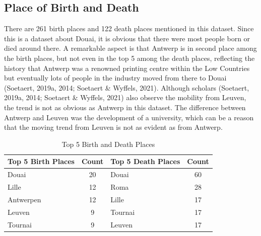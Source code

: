 \documentclass[12pt,a4paper,oneside]{book}
\begin{document}
\begin{sloppypar}
\subsection*{Place of Birth and Death}
There are 261 birth places and 122 death places mentioned in this dataset. Since this is a dataset about Douai, it is obvious that there were most people born or died around there. A remarkable aspect is that Antwerp is in second place among the birth places, but not even in the top 5 among the death places, reflecting the history that Antwerp was a renowned printing centre within the Low Countries but eventually lots of people in the industry moved from there to Douai (Soetaert, 2019a, 2014; Soetaert \& Wyffels, 2021). Although scholars (Soetaert, 2019a, 2014; Soetaert \& Wyffels, 2021) also observe the mobility from Leuven, the trend is not as obvious as Antwerp in this dataset. The difference between Antwerp and Leuven was the development of a university, which can be a reason that the moving trend from Leuven is not as evident as from Antwerp.

\begin{table}[H]
\centering
\caption{Top 5 Birth and Death Places}
\label{tab:top5BD}
\begin{tabular}{l|c|l|c}
\multicolumn{1}{c|}{\textbf{Top 5 Birth Places}} & \multicolumn{1}{c|}{\textbf{Count}} & \multicolumn{1}{c|}{\textbf{Top 5 Death Places}} & \multicolumn{1}{c}{\textbf{Count}} \\ \hline
Douai                                            & 20                                  & Douai                                            & 60                                 \\
Lille                                            & 12                                  & Roma                                             & 28                                 \\
Antwerpen                                        & 12                                  & Lille                                            & 17                                 \\
Leuven                                           & 9                                   & Tournai                                          & 17                                 \\
Tournai                                          & 9                                   & Leuven                                           & 17                                
\end{tabular}
\end{table}


\end{sloppypar}
\end{document}
